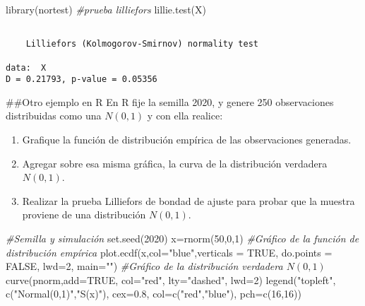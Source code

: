 \documentclass[
  a4paper,
  oneside,
  openany]{book}
\newenvironment{Shaded}{\begin{snugshade}}{\end{snugshade}}
\newcommand{\AttributeTok}[1]{\textcolor[rgb]{0.77,0.63,0.00}{#1}}
\newcommand{\CommentTok}[1]{\textcolor[rgb]{0.56,0.35,0.01}{\textit{#1}}}
\newcommand{\ConstantTok}[1]{\textcolor[rgb]{0.00,0.00,0.00}{#1}}
\newcommand{\DecValTok}[1]{\textcolor[rgb]{0.00,0.00,0.81}{#1}}
\newcommand{\FloatTok}[1]{\textcolor[rgb]{0.00,0.00,0.81}{#1}}
\newcommand{\FunctionTok}[1]{\textcolor[rgb]{0.00,0.00,0.00}{#1}}
\newcommand{\NormalTok}[1]{#1}
\newcommand{\OtherTok}[1]{\textcolor[rgb]{0.56,0.35,0.01}{#1}}
\newcommand{\StringTok}[1]{\textcolor[rgb]{0.31,0.60,0.02}{#1}}
\begin{document}
\begin{Shaded}
\begin{Highlighting}[]
\FunctionTok{library}\NormalTok{(nortest) }\CommentTok{\#prueba lilliefors}
\FunctionTok{lillie.test}\NormalTok{(X)}
\end{Highlighting}
\end{Shaded}

\begin{verbatim}

    Lilliefors (Kolmogorov-Smirnov) normality test

data:  X
D = 0.21793, p-value = 0.05356
\end{verbatim}

\#\#Otro ejemplo en R
En R fije la semilla 2020, y genere 250 observaciones distribuidas como una \(N(0, 1)\) y con ella realice:

\begin{enumerate}
\item Grafique la función de distribución empírica de las observaciones generadas.
\item Agregar sobre esa misma gráfica, la curva de la distribución verdadera $N(0,1)$. 
\item Realizar la prueba Lilliefors de bondad de ajuste para probar que la muestra proviene de una distribución $N(0,1)$.
\end{enumerate}

\begin{Shaded}
\begin{Highlighting}[]
\CommentTok{\#Semilla y simulación}
\FunctionTok{set.seed}\NormalTok{(}\DecValTok{2020}\NormalTok{)}
\NormalTok{x}\OtherTok{=}\FunctionTok{rnorm}\NormalTok{(}\DecValTok{50}\NormalTok{,}\DecValTok{0}\NormalTok{,}\DecValTok{1}\NormalTok{)}
\CommentTok{\#Gráfico de la función de distribución empírica}
\FunctionTok{plot.ecdf}\NormalTok{(x,}\AttributeTok{col=}\StringTok{"blue"}\NormalTok{,}\AttributeTok{verticals =} \ConstantTok{TRUE}\NormalTok{, }\AttributeTok{do.points =} \ConstantTok{FALSE}\NormalTok{, }\AttributeTok{lwd=}\DecValTok{2}\NormalTok{, }\AttributeTok{main=}\StringTok{""}\NormalTok{)}
\CommentTok{\#Gráfico de la distribución verdadera $N(0,1)$}
\FunctionTok{curve}\NormalTok{(pnorm,}\AttributeTok{add=}\ConstantTok{TRUE}\NormalTok{, }\AttributeTok{col=}\StringTok{"red"}\NormalTok{, }\AttributeTok{lty=}\StringTok{"dashed"}\NormalTok{, }\AttributeTok{lwd=}\DecValTok{2}\NormalTok{)}
\FunctionTok{legend}\NormalTok{(}\StringTok{"topleft"}\NormalTok{, }\FunctionTok{c}\NormalTok{(}\StringTok{"Normal(0,1)"}\NormalTok{,}\StringTok{"S(x)"}\NormalTok{), }\AttributeTok{cex=}\FloatTok{0.8}\NormalTok{, }\AttributeTok{col=}\FunctionTok{c}\NormalTok{(}\StringTok{"red"}\NormalTok{,}\StringTok{"blue"}\NormalTok{), }\AttributeTok{pch=}\FunctionTok{c}\NormalTok{(}\DecValTok{16}\NormalTok{,}\DecValTok{16}\NormalTok{))}
\end{Highlighting}
\end{Shaded}
\end{document}
